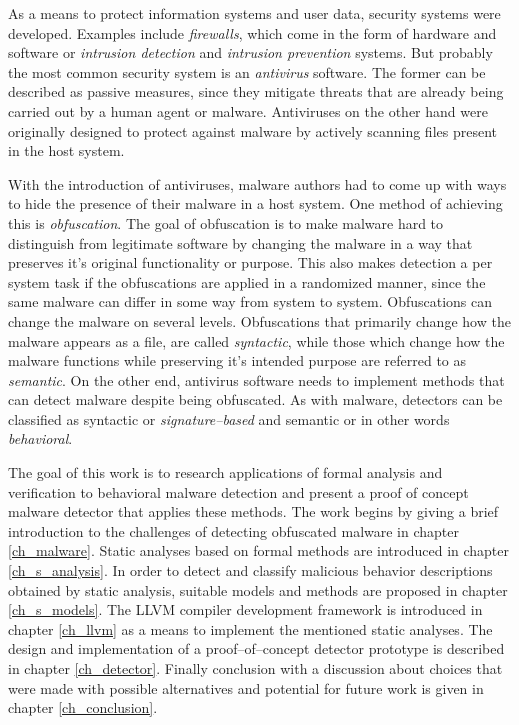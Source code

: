 As a means to protect information systems and user data, security systems were developed. Examples include \emph{firewalls}, which come in the form of hardware and software or \emph{intrusion detection} and \emph{intrusion prevention} systems. But probably the most common security system is an \emph{antivirus} software. The former can be described as passive measures, since they mitigate threats that are already being carried out by a human agent or malware. Antiviruses on the other hand were originally designed to protect against malware by actively scanning files present in the host system.

With the introduction of antiviruses, malware authors had to come up with ways to hide the presence of their malware in a host system. One method of achieving this is \emph{obfuscation}. The goal of obfuscation is to make malware hard to distinguish from legitimate software by changing the malware in a way that preserves it's original functionality or purpose. This also makes detection a per system task if the obfuscations are applied in a randomized manner, since the same malware can differ in some way from system to system. Obfuscations can change the malware on several levels. Obfuscations that primarily change how the malware appears as a file, are called \emph{syntactic}, while those which change how the malware functions while preserving it's intended purpose are referred to as \emph{semantic}. On the other end, antivirus software needs to implement methods that can detect malware despite being obfuscated. As with malware, detectors can be classified as syntactic or \emph{signature--based} and semantic or in other words \emph{behavioral}.

The goal of this work is to research applications of formal analysis and verification to behavioral malware detection and present a proof of concept malware detector that applies these methods. The work begins by giving a brief introduction to the challenges of detecting obfuscated malware in chapter \ref{ch_malware}. Static analyses based on formal methods are introduced in chapter \ref{ch_s_analysis}. In order to detect and classify malicious behavior descriptions obtained by static analysis, suitable models and methods are proposed in chapter \ref{ch_s_models}. The LLVM compiler development framework is introduced in chapter \ref{ch_llvm} as a means to implement the mentioned static analyses. The design and implementation of a proof--of--concept detector prototype is described in chapter \ref{ch_detector}. Finally conclusion with a discussion about choices that were made with possible alternatives and potential for future work is given in chapter \ref{ch_conclusion}.

